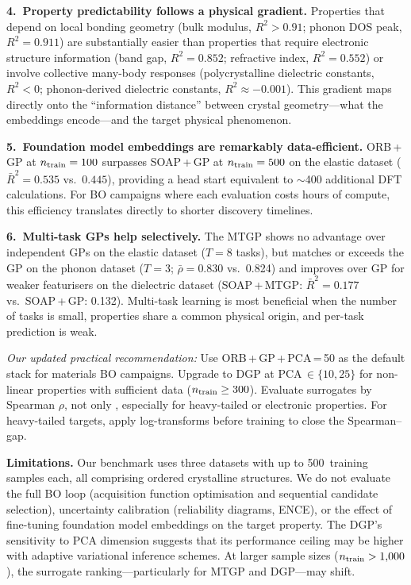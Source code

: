 \textbf{4.\ Property predictability follows a physical gradient.}
Properties that depend on local bonding geometry (bulk modulus, $R^2 > 0.91$; phonon DOS peak, $R^2 = 0.911$) are substantially easier than properties that require electronic structure information (band gap, $R^2 = 0.852$; refractive index, $R^2 = 0.552$) or involve collective many-body responses (polycrystalline dielectric constants, $R^2 < 0$; phonon-derived dielectric constants, $R^2 \approx -0.001$).
This gradient maps directly onto the ``information distance'' between crystal geometry---what the embeddings encode---and the target physical phenomenon.

\textbf{5.\ Foundation model embeddings are remarkably data-efficient.}
ORB\,+\,GP at $n_{\text{train}} = 100$ surpasses SOAP\,+\,GP at $n_{\text{train}} = 500$ on the elastic dataset ($\bar{R}^2 = 0.535$ vs.\ $0.445$), providing a head start equivalent to $\sim$400 additional DFT calculations.
For BO campaigns where each evaluation costs hours of compute, this efficiency translates directly to shorter discovery timelines.

\textbf{6.\ Multi-task GPs help selectively.}
The MTGP shows no advantage over independent GPs on the elastic dataset ($T = 8$ tasks), but matches or exceeds the GP on the phonon dataset ($T = 3$; $\bar{\rho} = 0.830$ vs.\ 0.824) and improves over GP for weaker featurisers on the dielectric dataset (SOAP\,+\,MTGP: $\bar{R}^2 = 0.177$ vs.\ SOAP\,+\,GP: 0.132).
Multi-task learning is most beneficial when the number of tasks is small, properties share a common physical origin, and per-task prediction is weak.

\emph{Our updated practical recommendation:} Use ORB\,+\,GP\,+\,PCA\,=\,50 as the default stack for materials BO campaigns.
Upgrade to DGP at PCA\,$\in \{10, 25\}$ for non-linear properties with sufficient data ($n_{\text{train}} \geq 300$).
Evaluate surrogates by Spearman $\rho$, not only \Rtwo{}, especially for heavy-tailed or electronic properties.
For heavy-tailed targets, apply log-transforms before training to close the Spearman--\Rtwo{} gap.

\textbf{Limitations.}
Our benchmark uses three datasets with up to 500~training samples each, all comprising ordered crystalline structures.
We do not evaluate the full BO loop (acquisition function optimisation and sequential candidate selection), uncertainty calibration (reliability diagrams, ENCE), or the effect of fine-tuning foundation model embeddings on the target property.
The DGP's sensitivity to PCA dimension suggests that its performance ceiling may be higher with adaptive variational inference schemes.
At larger sample sizes ($n_{\text{train}} > 1{,}000$), the surrogate ranking---particularly for MTGP and DGP---may shift.

